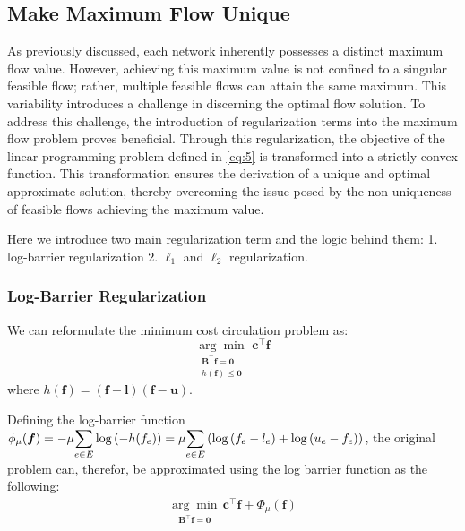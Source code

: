 \documentclass{article} %
\theoremstyle{bfnote}
\begin{document}
\subsection{Make Maximum Flow Unique}
As previously discussed, each network inherently possesses a distinct maximum flow value. However, achieving this maximum value is not confined to a singular feasible flow; rather, multiple feasible flows can attain the same maximum. This variability introduces a challenge in discerning the optimal flow solution. To address this challenge, the introduction of regularization terms into the maximum flow problem proves beneficial. Through this regularization, the objective of the linear programming problem defined in \cref{eq:5} is transformed into a strictly convex function. This transformation ensures the derivation of a unique and optimal approximate solution, thereby overcoming the issue posed by the non-uniqueness of feasible flows achieving the maximum value.

Here we introduce two main regularization term and the logic behind them: 1. log-barrier regularization 2. $\ell _1$ and $\ell_2$ regularization.

\subsubsection{Log-Barrier Regularization}
We can reformulate the minimum cost circulation problem as:
\begin{equation}
	\underset{\substack{\bm{B}^{\top} \bm{f}=\bm{0} \\ h(\bm{f}) \leq \bm{0} }}{\arg \min } \hspace{4pt} \bm{c}^{\top} \bm{f}
	\label{eq:8}
\end{equation}
where $h(\bm{f}) = (\bm{f}-\bm{l}) (\bm{f}-\bm{u})$. 

Defining the log-barrier function $\phi_{\mu}(\bm{f})=-\mu \mathlarger{\sum\limits_{e \in E}} \log \left(-h(f_e)\right) = \mu \mathlarger{\sum\limits_{e \in E}} \left( \log \left(f_e-l_e\right) +\log \left(u_e-f_e\right) \right)$, the original problem can, therefor, be approximated using the log barrier function as the following:
\begin{equation}
	\begin{array}{ll}
		\underset{\substack{\bm{B}^{\top} \bm{f}=\bm{0}}}{\arg \min } \hspace{2pt} \bm{c}^{\top} \bm{f} + \Phi_{\mu}(\bm{f}) %
	\end{array}
	\label{eq:9}
\end{equation}
\end{document}
